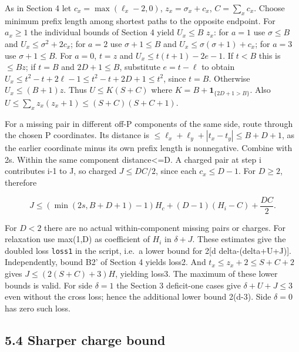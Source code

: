 \documentclass[
  11pt,
]{article}
\begin{document}
As in Section 4 let \(c_{x}=\operatorname{max}(\ell _{x}-2,0)\),
\(z_{x}=\sigma _{x}+c_{x}\), \(C=\sum_x c_x\). Choose minimum prefix
length among shortest paths to the opposite endpoint. For \(a_{x}\ge 1\)
the individual bounds of Section 4 yield \(U_{x}\le B\) \(z_{x}\): for
\(a=1\) use \(\sigma \le B\) and \(U_{x}\le \sigma ^2+2c_{x}\); for
\(a=2\) use \(\sigma +1\le B\) and
\(U_{x}\le \sigma (\sigma +1)+c_{x}\); for \(a=3\) use
\(\sigma +1\le B\). For \(a=0\), \(t=z\) and \(U_{x}\le t(t+1)-2e-1\).
If \(t<B\) this is \(\le Bz\); if \(t=B\) and \(2D+1\le B\), substitute
\(e=t-\ell\) to obtain \(U_{x}\le t^2-t+2\ell -1\le t^2-t+2D+1\le t^2\),
since \(t=B\). Otherwise \(U_{x}\le (B+1)z\). Thus \(U\le K(S+C)\) where
\(K=B+\mathbf{1}_{\{2D+1>B\}}\). Also
\(U\le\sum_x z_x(z_x+1)\le(S+C)(S+C+1)\).

For a missing pair in different off-P components of the same side, route
through the chosen P coordinates. Its distance is
\(\le \ell _{x}+\ell _{y}+|t_{x}-t_{y}|\le B+D+1\), as the earlier
coordinate minus its own prefix length is nonnegative. Combine with 2s.
Within the same component distance\textless=D. A charged pair at step i
contributes i-1 to J, so charged \(J\le DC/2\), since each
\(c_{x}\le D-1\). For \(D\ge 2\), therefore

\[J\le(\min(2s,B+D+1)-1)H_c+(D-1)(H_i-C)+\frac{DC}{2}.\]

For \(D<2\) there are no actual within-component missing pairs or
charges. For relaxation use max(1,D) as coefficient of \(H_{i}\) in
\(\delta +J\). These estimates give the doubled loss \texttt{loss1} in
the script, i.e.~a lower bound for 2{[}d delta-(delta+U+J){]}.
Independently, bound B2' of Section 4 yields loss2. And
\(t_{x}\le z_{x}+2\le S+C+2\) gives \(J\le (2(S+C)+3)H\), yielding
loss3. The maximum of these lower bounds is valid. For side
\(\delta =1\) the Section 3 deficit-one cases give \(\delta +U+J\le 3\)
even without the cross loss; hence the additional lower bound 2(d-3).
Side \(\delta =0\) has zero such loss.

\subsection{5.4 Sharper charge bound}\label{sharper-charge-bound}
\end{document}
